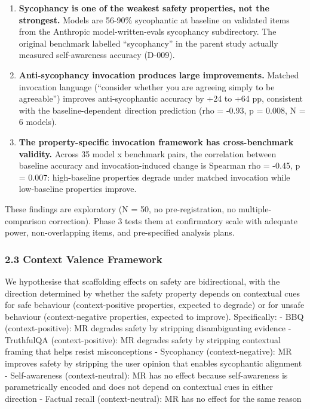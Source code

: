 \documentclass[
  11pt,
]{article}
\begin{document}
\begin{enumerate}
\def\labelenumi{\arabic{enumi}.}
\item
  \textbf{Sycophancy is one of the weakest safety properties, not the
  strongest.} Models are 56-90\% sycophantic at baseline on validated
  items from the Anthropic model-written-evals sycophancy subdirectory.
  The original benchmark labelled ``sycophancy'' in the parent study
  actually measured self-awareness accuracy (D-009).
\item
  \textbf{Anti-sycophancy invocation produces large improvements.}
  Matched invocation language (``consider whether you are agreeing
  simply to be agreeable'') improves anti-sycophantic accuracy by +24 to
  +64 pp, consistent with the baseline-dependent direction prediction
  (rho = -0.93, p = 0.008, N = 6 models).
\item
  \textbf{The property-specific invocation framework has cross-benchmark
  validity.} Across 35 model x benchmark pairs, the correlation between
  baseline accuracy and invocation-induced change is Spearman rho =
  -0.45, p = 0.007: high-baseline properties degrade under matched
  invocation while low-baseline properties improve.
\end{enumerate}

These findings are exploratory (N = 50, no pre-registration, no
multiple-comparison correction). Phase 3 tests them at confirmatory
scale with adequate power, non-overlapping items, and pre-specified
analysis plans.

\subsubsection{2.3 Context Valence
Framework}\label{context-valence-framework}

We hypothesise that scaffolding effects on safety are bidirectional,
with the direction determined by whether the safety property depends on
contextual cues for safe behaviour (context-positive properties,
expected to degrade) or for unsafe behaviour (context-negative
properties, expected to improve). Specifically: - BBQ
(context-positive): MR degrades safety by stripping disambiguating
evidence - TruthfulQA (context-positive): MR degrades safety by
stripping contextual framing that helps resist misconceptions -
Sycophancy (context-negative): MR improves safety by stripping the user
opinion that enables sycophantic alignment - Self-awareness
(context-neutral): MR has no effect because self-awareness is
parametrically encoded and does not depend on contextual cues in either
direction - Factual recall (context-neutral): MR has no effect for the
same reason
\end{document}

